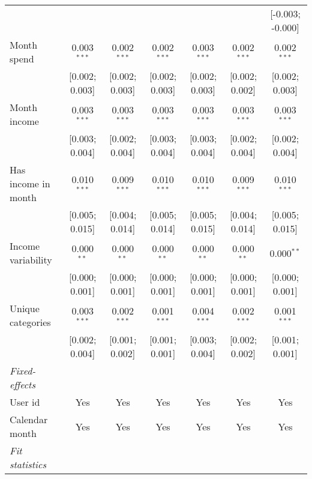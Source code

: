 \begin{table}[htbp]
\begin{threeparttable}[b]
\begin{tabular}{lcccccc}
                                        &                &                &                &                 &                 & [-0.003; -0.000]\\   
         Month spend                    & 0.003$^{***}$  & 0.002$^{***}$  & 0.002$^{***}$  & 0.003$^{***}$   & 0.002$^{***}$   & 0.002$^{***}$\\   
                                        & [0.002; 0.003] & [0.002; 0.003] & [0.002; 0.003] & [0.002; 0.003]  & [0.002; 0.002]  & [0.002; 0.003]\\   
         Month income                   & 0.003$^{***}$  & 0.003$^{***}$  & 0.003$^{***}$  & 0.003$^{***}$   & 0.003$^{***}$   & 0.003$^{***}$\\   
                                        & [0.003; 0.004] & [0.002; 0.004] & [0.003; 0.004] & [0.003; 0.004]  & [0.002; 0.004]  & [0.002; 0.004]\\   
         Has income in month            & 0.010$^{***}$  & 0.009$^{***}$  & 0.010$^{***}$  & 0.010$^{***}$   & 0.009$^{***}$   & 0.010$^{***}$\\   
                                        & [0.005; 0.015] & [0.004; 0.014] & [0.005; 0.014] & [0.005; 0.015]  & [0.004; 0.014]  & [0.005; 0.015]\\   
         Income variability             & 0.000$^{**}$   & 0.000$^{**}$   & 0.000$^{**}$   & 0.000$^{**}$    & 0.000$^{**}$    & 0.000$^{**}$\\   
                                        & [0.000; 0.001] & [0.000; 0.001] & [0.000; 0.001] & [0.000; 0.001]  & [0.000; 0.001]  & [0.000; 0.001]\\   
         Unique categories              & 0.003$^{***}$  & 0.002$^{***}$  & 0.001$^{***}$  & 0.004$^{***}$   & 0.002$^{***}$   & 0.001$^{***}$\\   
                                        & [0.002; 0.004] & [0.001; 0.002] & [0.001; 0.001] & [0.003; 0.004]  & [0.002; 0.002]  & [0.001; 0.001]\\   
         \midrule
         \emph{Fixed-effects}\\
         User id                        & Yes            & Yes            & Yes            & Yes             & Yes             & Yes\\  
         Calendar month                 & Yes            & Yes            & Yes            & Yes             & Yes             & Yes\\  
         \midrule
         \emph{Fit statistics}\\

\end{tabular}
\end{threeparttable}
\end{table}
